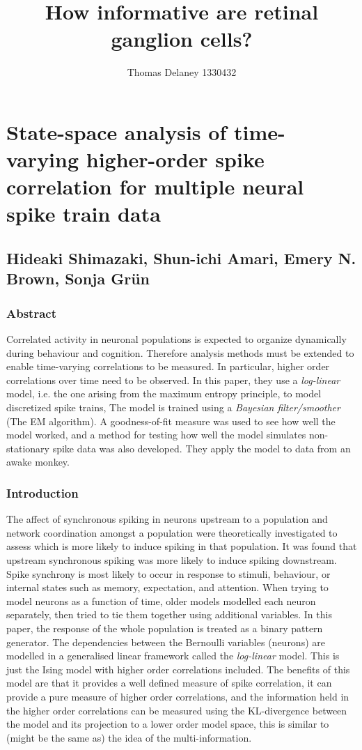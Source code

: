 \documentclass[a4paper,12pt]{article}
\title{How informative are retinal ganglion cells?}
\author{Thomas Delaney 1330432}
\theoremstyle{definition}
\begin{document}
\section*{State-space analysis of time-varying higher-order spike correlation for multiple neural spike train data}
\subsection*{Hideaki Shimazaki, Shun-ichi Amari, Emery N. Brown, Sonja Gr\"{u}n}
\subsubsection*{Abstract}
	Correlated activity in neuronal populations is expected to organize dynamically during behaviour and cognition. Therefore analysis methods must be extended to enable time-varying correlations to be measured. In particular, higher order correlations over time need to be observed. In this paper, they use a \textit{log-linear} model, i.e. the one arising from the maximum entropy principle, to model discretized spike trains, The model is trained using a \textit{Bayesian filter/smoother} (The EM algorithm). A goodness-of-fit measure was used to see how well the model worked, and a method for testing how well the model simulates non-stationary spike data was also developed. They apply the model to data from an awake monkey.

\subsubsection*{Introduction}
	The affect of synchronous spiking in neurons upstream to a population and network coordination amongst a population were theoretically investigated to assess which is more likely to induce spiking in that population. It was found that upstream synchronous spiking was more likely to induce spiking downstream. Spike synchrony is most likely to occur in response to stimuli, behaviour, or internal states such as memory, expectation, and attention. When trying to model neurons as a function of time, older models modelled each neuron separately, then tried to tie them together using additional variables. In this paper, the response of the whole population is treated as a binary pattern generator. The dependencies between the Bernoulli variables (neurons) are modelled in a generalised linear framework called the \textit{log-linear} model. This is just the Ising model with higher order correlations included. The benefits of this model are that it provides a well defined measure of spike correlation, it can provide a pure measure of higher order correlations, and the information held in the higher order correlations can be measured using the KL-divergence between the model and its projection to a lower order model space, this is similar to (might be the same as) the idea of the multi-information.
	
\end{document}
